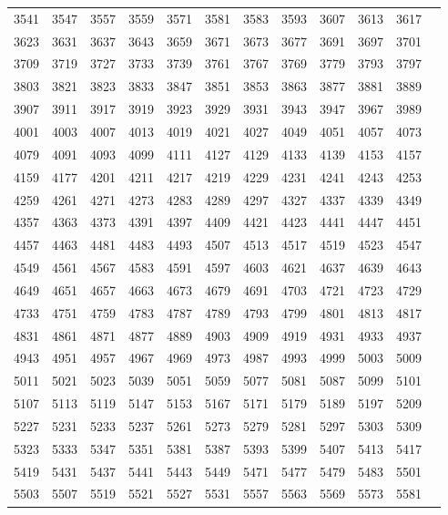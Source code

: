 \begin{table}
\begin{tabular}{llllllllllll}
3541 & 3547 & 3557 & 3559 & 3571 & 3581 & 3583 & 3593 & 3607 & 3613 & 3617 \\ 
3623 & 3631 & 3637 & 3643 & 3659 & 3671 & 3673 & 3677 & 3691 & 3697 & 3701 \\ 
3709 & 3719 & 3727 & 3733 & 3739 & 3761 & 3767 & 3769 & 3779 & 3793 & 3797 \\ 
3803 & 3821 & 3823 & 3833 & 3847 & 3851 & 3853 & 3863 & 3877 & 3881 & 3889 \\ 
3907 & 3911 & 3917 & 3919 & 3923 & 3929 & 3931 & 3943 & 3947 & 3967 & 3989 \\ 
4001 & 4003 & 4007 & 4013 & 4019 & 4021 & 4027 & 4049 & 4051 & 4057 & 4073 \\ 
4079 & 4091 & 4093 & 4099 & 4111 & 4127 & 4129 & 4133 & 4139 & 4153 & 4157 \\ 
4159 & 4177 & 4201 & 4211 & 4217 & 4219 & 4229 & 4231 & 4241 & 4243 & 4253 \\ 
4259 & 4261 & 4271 & 4273 & 4283 & 4289 & 4297 & 4327 & 4337 & 4339 & 4349 \\ 
4357 & 4363 & 4373 & 4391 & 4397 & 4409 & 4421 & 4423 & 4441 & 4447 & 4451 \\ 
4457 & 4463 & 4481 & 4483 & 4493 & 4507 & 4513 & 4517 & 4519 & 4523 & 4547 \\ 
4549 & 4561 & 4567 & 4583 & 4591 & 4597 & 4603 & 4621 & 4637 & 4639 & 4643 \\ 
4649 & 4651 & 4657 & 4663 & 4673 & 4679 & 4691 & 4703 & 4721 & 4723 & 4729 \\ 
4733 & 4751 & 4759 & 4783 & 4787 & 4789 & 4793 & 4799 & 4801 & 4813 & 4817 \\ 
4831 & 4861 & 4871 & 4877 & 4889 & 4903 & 4909 & 4919 & 4931 & 4933 & 4937 \\ 
4943 & 4951 & 4957 & 4967 & 4969 & 4973 & 4987 & 4993 & 4999 & 5003 & 5009 \\ 
5011 & 5021 & 5023 & 5039 & 5051 & 5059 & 5077 & 5081 & 5087 & 5099 & 5101 \\ 
5107 & 5113 & 5119 & 5147 & 5153 & 5167 & 5171 & 5179 & 5189 & 5197 & 5209 \\ 
5227 & 5231 & 5233 & 5237 & 5261 & 5273 & 5279 & 5281 & 5297 & 5303 & 5309 \\ 
5323 & 5333 & 5347 & 5351 & 5381 & 5387 & 5393 & 5399 & 5407 & 5413 & 5417 \\ 
5419 & 5431 & 5437 & 5441 & 5443 & 5449 & 5471 & 5477 & 5479 & 5483 & 5501 \\ 
5503 & 5507 & 5519 & 5521 & 5527 & 5531 & 5557 & 5563 & 5569 & 5573 & 5581 \\ 

\end{tabular}
\end{table}
